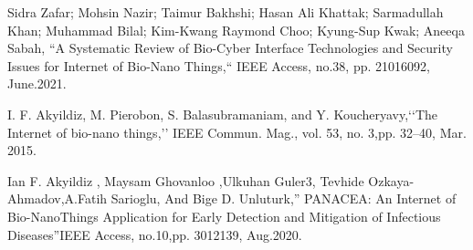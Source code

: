 \documentclass[12pt,a4paper]{report}
\begin{document}
\begin{thebibliography}{99}
 Sidra Zafar; Mohsin Nazir; Taimur Bakhshi; 
Hasan Ali Khattak; Sarmadullah Khan; Muhammad Bilal; 
Kim-Kwang Raymond Choo; Kyung-Sup Kwak; Aneeqa Sabah, 
“A Systematic Review of Bio-Cyber Interface Technologies 
and Security Issues for Internet of Bio-Nano Things,“ 
IEEE Access, no.38, pp. 21016092, June.2021.

I. F. Akyildiz, M. Pierobon, S. Balasubramaniam, 
and Y. Koucheryavy,‘‘The Internet of bio-nano things,’’ IEEE
 Commun. Mag., vol. 53, no. 3,pp. 32–40, Mar. 2015.

Ian F. Akyildiz , Maysam Ghovanloo ,Ulkuhan Guler3, Tevhide 
Ozkaya-Ahmadov,A.Fatih Sarioglu, And Bige D. Unluturk,” PANACEA: 
An Internet of Bio-NanoThings Application for Early Detection and 
Mitigation of Infectious Diseases”IEEE Access, no.10,pp. 3012139, Aug.2020.

\end{thebibliography}
\end{document}

